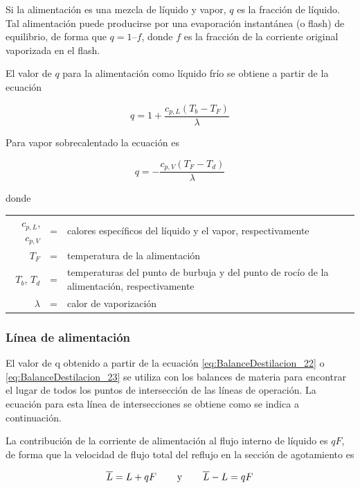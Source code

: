 \documentclass[11pt]{book}
\begin{document}
Si la alimentación es una mezcla de líquido y vapor, $q$ es la fracción de líquido. Tal alimentación puede producirse por una evaporación instantánea (o flash) de equilibrio, de forma que $q = 1 – f$, donde $f$ es la fracción de la corriente original vaporizada en el flash.

El valor de $q$ para la alimentación como líquido frío se obtiene a partir de la ecuación

\begin{equation}
    \label{eq:BalanceDestilacion_22}
    q = 1 + \frac{c_{p,L} (T_b -T_F)}{\lambda}
\end{equation}

Para vapor sobrecalentado la ecuación es

\begin{equation}
    \label{eq:BalanceDestilacion_23}
    q = - \frac{c_{p,V} (T_F -T_d)}{\lambda}
\end{equation}

donde

\hspace{0.25cm}

\begin{tabular}{r c p{12.5cm}}
    $c_{p,L}$, $c_{p,V}$ & = & calores específicos del líquido y el vapor, respectivamente \\
    $T_F$ & = & temperatura de la alimentación \\
    $T_b$, $T_d$ & = & temperaturas del punto de burbuja y del punto de rocío de la alimentación, respectivamente \\
    $\lambda$ & = & calor de vaporización
\end{tabular}

\subsubsection{Línea de alimentación}

El valor de q obtenido a partir de la ecuación \ref{eq:BalanceDestilacion_22} o \ref{eq:BalanceDestilacion_23} se utiliza con los balances de materia para encontrar el lugar de todos los puntos de intersección de las líneas de operación. La ecuación para esta línea de intersecciones se obtiene como se indica a continuación.

La contribución de la corriente de alimentación al flujo interno de líquido es $qF$, de forma que la velocidad de flujo total del reflujo en la sección de agotamiento es

\begin{equation}
    \label{eq:BalanceDestilacion_24}
    \overline{L} = L + qF \hspace{0.75cm} \textrm{y} \hspace{0.75cm} \overline{L}-L = qF
\end{equation}
\end{document}
